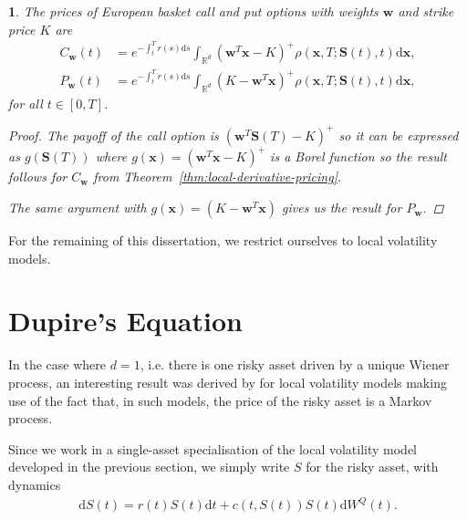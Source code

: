 \documentclass[english]{article}
\numberwithin{equation}{section}
\numberwithin{figure}{section}
\theoremstyle{bolddescit}
\theoremstyle{definition}
\theoremstyle{definition}
\theoremstyle{plain}
\theoremstyle{plain}
\newtheorem{corollary}[theorem]{\protect\corollaryname}
\theoremstyle{bolddesc}
\theoremstyle{plain}
\theoremstyle{remark}
\providecommand{\corollaryname}{Corollary}
\begin{document}
\begin{corollary}\label{cor:local-option-pricing}
  The prices of European basket call and put options with weights $\mathbf{w}$ and strike price $K$ are
  \begin{align*}
    C_\mathbf{w}(t)
    &= e^{-\int_t^T r(s) \mathrm{d}s} \int_{\mathbb{R}^d} \left(\mathbf{w}^T\mathbf{x} - K\right)^+ \rho(\mathbf{x},T;\mathbf{S}(t),t) \mathrm{d}\mathbf{x},\\
    P_\mathbf{w}(t)
    &= e^{-\int_t^T r(s) \mathrm{d}s} \int_{\mathbb{R}^d} \left(K - \mathbf{w}^T\mathbf{x}\right)^+ \rho(\mathbf{x},T;\mathbf{S}(t),t) \mathrm{d}\mathbf{x},
  \end{align*}
  for all $t \in [0,T]$.

  \begin{proof}
    The payoff of the call option is $(\mathbf{w}^T \mathbf{S}(T) - K)^+$ so it can be expressed as $g(\mathbf{S}(T))$ where $g(\mathbf{x}) = (\mathbf{w}^T \mathbf{x} - K)^+$ is a Borel function so the result follows for $C_\mathbf{w}$ from Theorem~\ref{thm:local-derivative-pricing}.

    The same argument with $g(\mathbf{x}) = (K - \mathbf{w}^T \mathbf{x})$ gives us the result for $P_\mathbf{w}$.
  \end{proof}
\end{corollary}

For the remaining of this dissertation, we restrict ourselves to local volatility models.

\section{Dupire's Equation}\label{sec:dupire}


In the case where $d=1$, i.e. there is one risky asset driven by a unique Wiener process, an interesting result was derived by \textcite{dupire_pricing_1993} for local volatility models making use of the fact that, in such models, the price of the risky asset is a Markov process.

Since we work in a single-asset specialisation of the local volatility model developed in the previous section, we simply write $S$ for the risky asset, with dynamics
\begin{align*}
  \mathrm{d}S(t) = r(t) S(t) \mathrm{d}t + c(t,S(t)) S(t) \mathrm{d}W^Q(t).
\end{align*}
\end{document}
